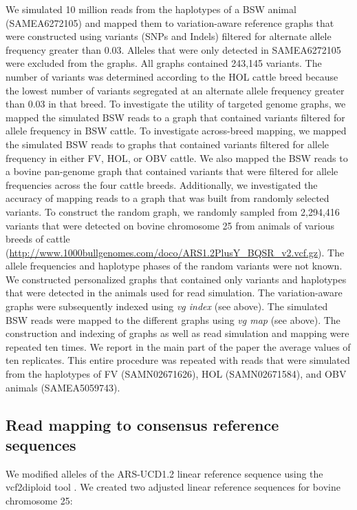 \documentclass[../main.tex]{subfiles}
\begin{document}
We simulated 10 million reads from the haplotypes of a BSW animal (SAMEA6272105) and mapped them to variation-aware reference graphs that were constructed using variants (SNPs and Indels) filtered for alternate allele frequency greater than 0.03. Alleles that were only detected in SAMEA6272105 were excluded from the graphs. All graphs contained 243,145 variants. The number of variants was determined according to the HOL cattle breed because the lowest number of variants segregated at an alternate allele frequency greater than 0.03 in that breed. To investigate the utility of targeted genome graphs, we mapped the simulated BSW reads to a graph that contained variants filtered for allele frequency in BSW cattle. To investigate across-breed mapping, we mapped the simulated BSW reads to graphs that contained variants filtered for allele frequency in either FV, HOL, or OBV cattle. We also mapped the BSW reads to a bovine pan-genome graph that contained variants that were filtered for allele frequencies across the four cattle breeds. Additionally, we investigated the accuracy of mapping reads to a graph that was built from randomly selected variants. To construct the random graph, we randomly sampled from 2,294,416 variants that were detected on bovine chromosome 25 from animals of various breeds of cattle (\url{http://www.1000bullgenomes.com/doco/ARS1.2PlusY_BQSR_v2.vcf.gz}). The allele frequencies and haplotype phases of the random variants were not known. We constructed personalized graphs that contained only variants and haplotypes that were detected in the animals used for read simulation. The variation-aware graphs were subsequently indexed using \emph{vg index} (see above). The simulated BSW reads were mapped to the different graphs using \emph{vg map} (see above). The construction and indexing of graphs as well as read simulation and mapping were repeated ten times. We report in the main part of the paper the average values of ten replicates. This entire procedure was repeated with reads that were simulated from the haplotypes of FV (SAMN02671626), HOL (SAMN02671584), and OBV animals (SAMEA5059743).

\subsection*{Read mapping to consensus reference sequences}

We modified alleles of the ARS-UCD1.2 linear reference sequence using the vcf2diploid tool \citep{rozowsky2011alleleseq}. We created two adjusted linear reference sequences for bovine chromosome 25:
\end{document}
